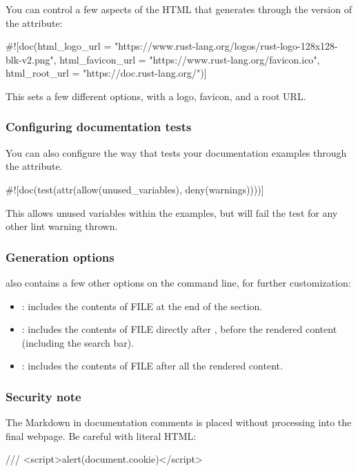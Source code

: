 You can control a few aspects of the HTML that  generates through the \code{\#![doc]} version of the attribute:

\begin{rustc}
#![doc(html_logo_url = "https://www.rust-lang.org/logos/rust-logo-128x128-blk-v2.png",
       html_favicon_url = "https://www.rust-lang.org/favicon.ico",
       html_root_url = "https://doc.rust-lang.org/")]
\end{rustc}

This sets a few different options, with a logo, favicon, and a root URL.

\subsubsection*{Configuring documentation tests}

You can also configure the way that  tests your documentation examples through the  attribute.

\begin{rustc}
#![doc(test(attr(allow(unused_variables), deny(warnings))))]
\end{rustc}

This allows unused variables within the examples, but will fail the test for any other lint warning thrown.

\subsubsection*{Generation options}

 also contains a few other options on the command line, for further customization:

\begin{itemize}
  \item{: includes the contents of FILE at the end of the  section.}
  \item{: includes the contents of FILE directly after , before the rendered 
      content (including the search bar).}
  \item{: includes the contents of FILE after all the rendered content.}
\end{itemize}

\subsubsection*{Security note}

The Markdown in documentation comments is placed without processing into the final webpage. Be careful with literal HTML:

\begin{rustc}
/// <script>alert(document.cookie)</script>
\end{rustc}
